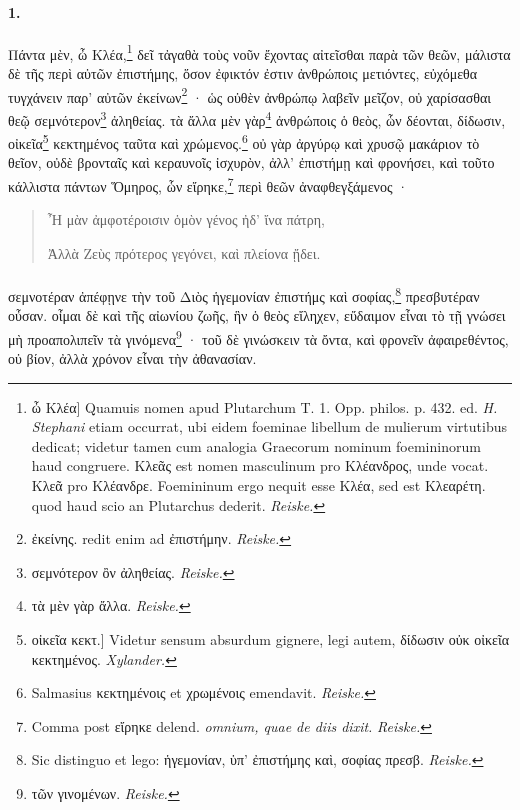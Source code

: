 \documentclass[a4paper, 11pt, oneside, polutonikogreek, german, landscape]{article}
\begin{document}
\paragraph{1.}
Πάντα μὲν, ὦ Κλέα,\footnote{ὦ Κλέα] Quamuis nomen apud Plutarchum T. 1. Opp. philos. p. 432. ed. \emph{H. Stephani} etiam occurrat, ubi eidem foeminae libellum de mulierum virtutibus dedicat; videtur tamen cum analogia Graecorum nominum foemininorum haud congruere. Κλεᾶς est nomen masculinum pro Κλέανδρος, unde vocat. Κλεᾶ pro Κλέανδρε. Foemininum ergo nequit esse Κλέα, sed est Κλεαρέτη. quod haud scio an Plutarchus dederit. \emph{Reiske.}} δεῖ τἀγαθὰ τοὺς νοῦν ἔχοντας αἰτεῖσθαι παρὰ τῶν θεῶν, μάλιστα δὲ τῆς περὶ αὐτῶν ἐπιστήμης, ὅσον ἐφικτόν ἐστιν ἀνθρώποις μετιόντες, εὐχόμεθα τυγχάνειν παρ' αὐτῶν ἐκείνων\footnote{ἐκείνης. redit enim ad ἐπιστήμην. \emph{Reiske.}} · ὡς οὐθὲν ἀνθρώπῳ λαβεῖν μεῖζον, οὐ χαρίσασθαι θεῷ σεμνότερον\footnote{σεμνότερον ὂν ἀληθείας. \emph{Reiske.}} ἀληθείας. τὰ ἄλλα μὲν γὰρ\footnote{τὰ μὲν γὰρ ἄλλα. \emph{Reiske.}} ἀνθρώποις ὁ θεὸς, ὧν δέονται, δίδωσιν, οἰκεῖα\footnote{οἰκεῖα κεκτ.] Videtur sensum absurdum gignere, legi autem, δίδωσιν οὐκ οἰκεῖα κεκτημένος. \emph{Xylander.}} κεκτημένος ταῦτα καὶ χρώμενος.\footnote{Salmasius κεκτημένοις et χρωμένοις emendavit. \emph{Reiske.}} οὐ γὰρ ἀργύρῳ καὶ χρυσῷ μακάριον τὸ θεῖον, οὐδὲ βρονταῖς καὶ κεραυνοῖς ἰσχυρὸν, ἀλλ' ἐπιστήμῃ καὶ φρονήσει, καὶ τοῦτο κάλλιστα πάντων Ὅμηρος, ὧν εἴρηκε,\footnote{Comma post εἴρηκε delend. \emph{omnium, quae de diis dixit.} \emph{Reiske.}} περὶ θεῶν ἀναφθεγξάμενος ·
\begin{quotation}\small
Ἦ μὰν ἀμφοτέροισιν ὁμὸν γένος ἠδ' ἴνα πάτρη,

Ἀλλὰ Ζεὺς πρότερος γεγόνει, καὶ πλείονα ᾔδει.
\end{quotation}
\paragraph{}
σεμνοτέραν ἀπέφῃνε τὴν τοῦ Διὸς ἡγεμονίαν ἐπιστήμς καὶ σοφίας,\footnote{Sic distinguo et lego: ἡγεμονίαν, ὑπ' ἐπιστήμης καὶ, σοφίας πρεσβ. \emph{Reiske.}} πρεσβυτέραν οὖσαν. οἶμαι δὲ καὶ τῆς αἰωνίου ζωῆς, ἣν ὁ θεὸς εἴληχεν, εὔδαιμον εἶναι τὸ τῇ γνώσει μὴ προαπολιπεῖν τὰ γινόμενα\footnote{τῶν γινομένων. \emph{Reiske.}} · τοῦ δὲ γινώσκειν τὰ ὄντα, καὶ φρονεῖν ἀφαιρεθέντος, οὐ βίον, ἀλλὰ χρόνον εἶναι τὴν ἀθανασίαν.
\end{document}
